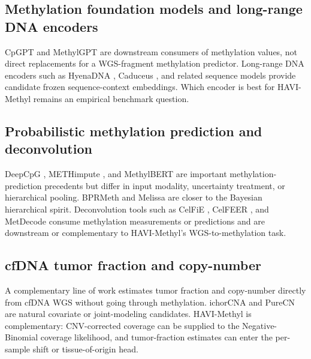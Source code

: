 \subsection{Methylation foundation models and long-range DNA encoders}
CpGPT \citep{cpgpt2024} and MethylGPT \citep{methylgpt2024} are downstream consumers of methylation values, not direct replacements for a WGS-fragment methylation predictor. Long-range DNA encoders such as HyenaDNA \citep{nguyen2023hyenadna}, Caduceus \citep{schiff2024caduceus}, and related sequence models provide candidate frozen sequence-context embeddings. Which encoder is best for HAVI-Methyl remains an empirical benchmark question.

\subsection{Probabilistic methylation prediction and deconvolution}
DeepCpG \citep{angermueller2017deepcpg}, METHimpute \citep{taudt2018methimpute}, and MethylBERT \citep{lee2018methylbert} are important methylation-prediction precedents but differ in input modality, uncertainty treatment, or hierarchical pooling. BPRMeth \citep{kapourani2018bprmeth} and Melissa \citep{kapourani2019melissa} are closer to the Bayesian hierarchical spirit. Deconvolution tools such as CelFiE \citep{caggiano2021celfie}, CelFEER \citep{keukeleire2023celfeer}, and MetDecode \citep{decroos2024metdecode} consume methylation measurements or predictions and are downstream or complementary to HAVI-Methyl's WGS-to-methylation task.

\subsection{cfDNA tumor fraction and copy-number}
A complementary line of work estimates tumor fraction and copy-number directly from cfDNA WGS without going through methylation. ichorCNA \citep{adalsteinsson2017ichor} and PureCN \citep{riester2016purecn} are natural covariate or joint-modeling candidates. HAVI-Methyl is complementary: CNV-corrected coverage can be supplied to the Negative-Binomial coverage likelihood, and tumor-fraction estimates can enter the per-sample shift or tissue-of-origin head.

